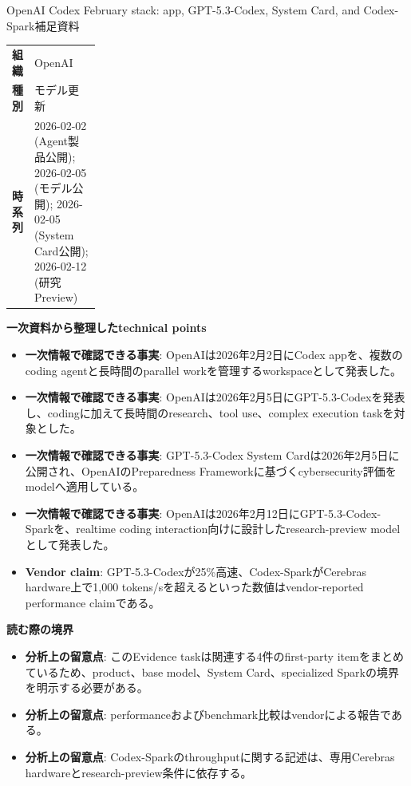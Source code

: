 \begin{technicalnote}{OpenAI Codex February stack: app, GPT-5.3-Codex, System Card, and Codex-Spark}{補足資料}
\begingroup
\begin{tabularx}{\linewidth}{@{}>{\bfseries}p{0.22\linewidth}X@{}}
組織 & OpenAI \\
種別 & モデル更新 \\
時系列 & 2026-02-02 (Agent製品公開); 2026-02-05 (モデル公開); 2026-02-05 (System Card公開); 2026-02-12 (研究Preview) \\
\end{tabularx}
\smallskip
{\bfseries 一次資料から整理したtechnical points}
\begin{itemize}[leftmargin=1.5em,itemsep=0.35em]
\item \textbf{一次情報で確認できる事実}: OpenAIは2026年2月2日にCodex appを、複数のcoding agentと長時間のparallel workを管理するworkspaceとして発表した。
\item \textbf{一次情報で確認できる事実}: OpenAIは2026年2月5日にGPT-5.3-Codexを発表し、codingに加えて長時間のresearch、tool use、complex execution taskを対象とした。
\item \textbf{一次情報で確認できる事実}: GPT-5.3-Codex System Cardは2026年2月5日に公開され、OpenAIのPreparedness Frameworkに基づくcybersecurity評価をmodelへ適用している。
\item \textbf{一次情報で確認できる事実}: OpenAIは2026年2月12日にGPT-5.3-Codex-Sparkを、realtime coding interaction向けに設計したresearch-preview modelとして発表した。
\item \textbf{Vendor claim}: GPT-5.3-Codexが25\%高速、Codex-SparkがCerebras hardware上で1,000 tokens/sを超えるといった数値はvendor-reported performance claimである。
\end{itemize}
\begin{minipage}{\linewidth}
{\bfseries 読む際の境界}
\begin{itemize}[leftmargin=1.5em,itemsep=0.35em]
\item \textbf{分析上の留意点}: このEvidence taskは関連する4件のfirst-party itemをまとめているため、product、base model、System Card、specialized Sparkの境界を明示する必要がある。
\item \textbf{分析上の留意点}: performanceおよびbenchmark比較はvendorによる報告である。
\item \textbf{分析上の留意点}: Codex-Sparkのthroughputに関する記述は、専用Cerebras hardwareとresearch-preview条件に依存する。

\end{itemize}
\end{minipage}
\end{technicalnote}
